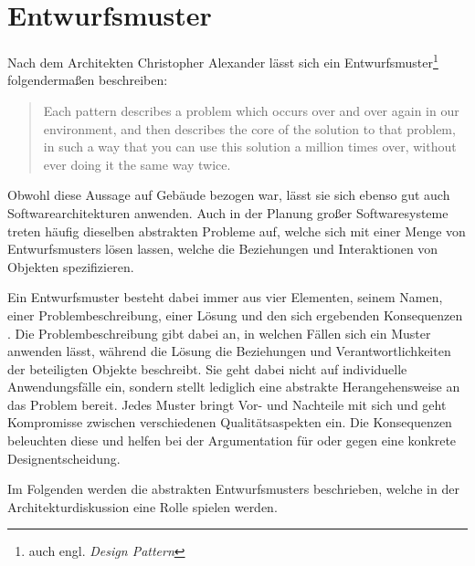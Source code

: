 \section{Entwurfsmuster}

Nach dem Architekten Christopher Alexander lässt sich ein Entwurfsmuster\footnote{auch engl. \emph{Design Pattern}} folgendermaßen beschreiben:

\blockquote{Each pattern describes a problem which occurs over and over again in our environment, and then describes the core of the solution to that problem, in such a way that you can use this solution a million times over, without ever doing it the same way twice.} \cite{gamma_design_1995}

Obwohl diese Aussage auf Gebäude bezogen war, lässt sie sich ebenso gut auch Softwarearchitekturen anwenden. Auch in der Planung großer Softwaresysteme treten häufig dieselben abstrakten Probleme auf, welche sich mit einer Menge von Entwurfsmusters lösen lassen, welche die Beziehungen und Interaktionen von Objekten spezifizieren.

Ein Entwurfsmuster besteht dabei immer aus vier Elementen, seinem Namen, einer Problembeschreibung, einer Lösung und den sich ergebenden Konsequenzen \cite{gamma_design_1995}. Die Problembeschreibung gibt dabei an, in welchen Fällen sich ein Muster anwenden lässt, während die Lösung die Beziehungen und Verantwortlichkeiten der beteiligten Objekte beschreibt. Sie geht dabei nicht auf individuelle Anwendungsfälle ein, sondern stellt lediglich eine abstrakte Herangehensweise an das Problem bereit. Jedes Muster bringt Vor- und Nachteile mit sich und geht Kompromisse zwischen verschiedenen Qualitätsaspekten ein. Die Konsequenzen beleuchten diese und helfen bei der Argumentation für oder gegen eine konkrete Designentscheidung.

Im Folgenden werden die abstrakten Entwurfsmusters beschrieben, welche in der Architekturdiskussion eine Rolle spielen werden.






